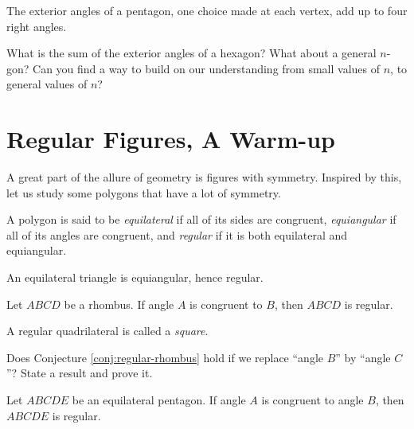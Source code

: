 \begin{conjecture}\label{conj:ext-angles-pentagon}
The exterior angles of a pentagon, one choice made at each vertex, add up to four right angles.
\end{conjecture}


\begin{question}\label{question-induction}
What is the sum of the exterior angles of a hexagon? 
What about a general $n$-gon? 
Can you find a way to build on our understanding from small values of $n$, to general values of $n$?
\end{question}



\chapter{Regular Figures, A Warm-up}

A great part of the allure of geometry is figures with symmetry. Inspired by this, let us study some polygons that have a lot of symmetry.

\begin{definition}\label{defn:regular}
A polygon is said to be \emph{equilateral} if all of its sides are congruent, \emph{equiangular} if all of its angles are congruent, and \emph{regular} if it is both equilateral and equiangular.
\end{definition}

\begin{conjecture}\label{conj:equilateral-triangle}
An equilateral triangle is equiangular, hence regular.
\end{conjecture}

\begin{conjecture}\label{conj:regular-rhombus}
Let $ABCD$ be a rhombus. If angle $A$ is congruent to $B$, then $ABCD$ is regular.
\end{conjecture}

\begin{definition}[reminder]\label{defn:square}
A regular quadrilateral is called a \emph{square}.
\end{definition}


\begin{problem}\label{prob:equilateral-quad}
Does Conjecture \ref{conj:regular-rhombus} hold if we replace ``angle $B$'' by ``angle $C$''? State a result and prove it.
\end{problem}

\begin{conjecture}\label{conj:equilateral-pentagon}
Let $ABCDE$ be an equilateral pentagon. If angle $A$ is congruent to angle $B$, then $ABCDE$ is regular.
\end{conjecture}



